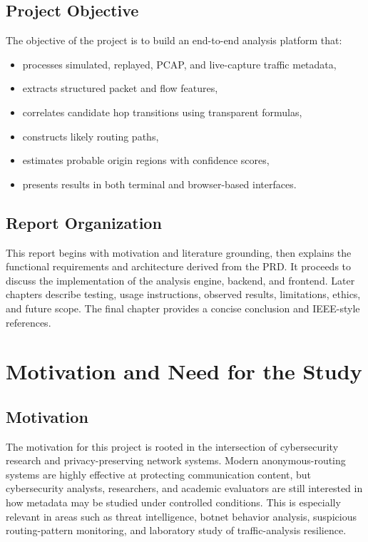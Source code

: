 \documentclass[12pt,a4paper]{report}
\begin{document}
\section{Project Objective}
The objective of the project is to build an end-to-end analysis platform that:
\begin{itemize}[leftmargin=1.5em]
    \item processes simulated, replayed, PCAP, and live-capture traffic metadata,
    \item extracts structured packet and flow features,
    \item correlates candidate hop transitions using transparent formulas,
    \item constructs likely routing paths,
    \item estimates probable origin regions with confidence scores,
    \item presents results in both terminal and browser-based interfaces.
\end{itemize}

\section{Report Organization}
This report begins with motivation and literature grounding, then explains the functional requirements and architecture derived from the PRD. It proceeds to discuss the implementation of the analysis engine, backend, and frontend. Later chapters describe testing, usage instructions, observed results, limitations, ethics, and future scope. The final chapter provides a concise conclusion and IEEE-style references.

\chapter{Motivation and Need for the Study}
\section{Motivation}
The motivation for this project is rooted in the intersection of cybersecurity research and privacy-preserving network systems. Modern anonymous-routing systems are highly effective at protecting communication content, but cybersecurity analysts, researchers, and academic evaluators are still interested in how metadata may be studied under controlled conditions. This is especially relevant in areas such as threat intelligence, botnet behavior analysis, suspicious routing-pattern monitoring, and laboratory study of traffic-analysis resilience.
\end{document}
